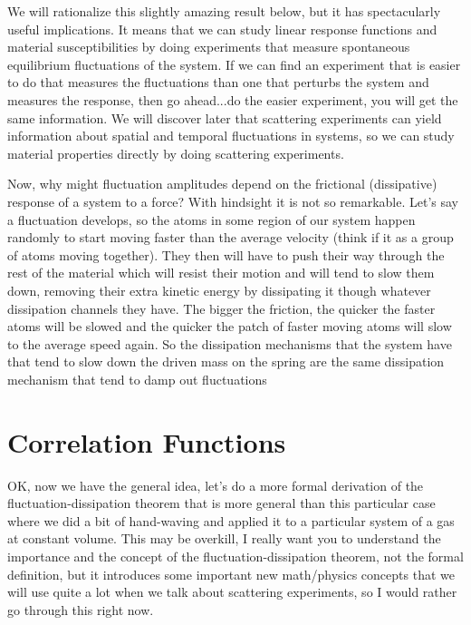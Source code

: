 \documentclass[]{revtex4}
\begin{document}
We will rationalize this slightly amazing result below, but it has spectacularly useful implications.  It means that we can study linear response functions
and material susceptibilities by doing experiments that measure spontaneous equilibrium fluctuations of the system.  If we can find an experiment
that is easier to do that measures the fluctuations than one that perturbs the system and measures the response, then go ahead...do the easier experiment,
you will get the same information.
We will discover later that scattering experiments can yield information about spatial and temporal fluctuations in systems, so we can study material
properties directly by doing scattering experiments.

Now, why might fluctuation amplitudes depend on the frictional (dissipative) response of a system to a force?  With hindsight it is not so
remarkable.  Let's say a fluctuation develops, so the atoms in some region of our system happen randomly to start moving faster than the average velocity
(think if it as a group of atoms moving together). They then will have to push their way through the rest of the material which will resist their motion
and will tend to slow them down, removing their extra kinetic energy by dissipating it though whatever dissipation channels they have.  The bigger the friction,
the quicker the faster atoms will be slowed and the quicker the patch of faster moving atoms will slow to the average speed again.  So the dissipation mechanisms
that the system have that tend to slow down the driven mass on the spring are the same dissipation mechanism that tend to damp out fluctuations

\section{Correlation Functions}

OK, now we have the general idea, let's do a more formal derivation of the fluctuation-dissipation theorem that is more general than this
particular case where we did a bit of hand-waving and applied it to a particular system of a gas at constant volume.  This may be overkill,
I really want you to understand the importance and the concept of the fluctuation-dissipation theorem, not the formal definition, but
it introduces some important new math/physics concepts that we will use quite a lot when we talk about scattering experiments, so I would rather
go through this right now.
\end{document}
